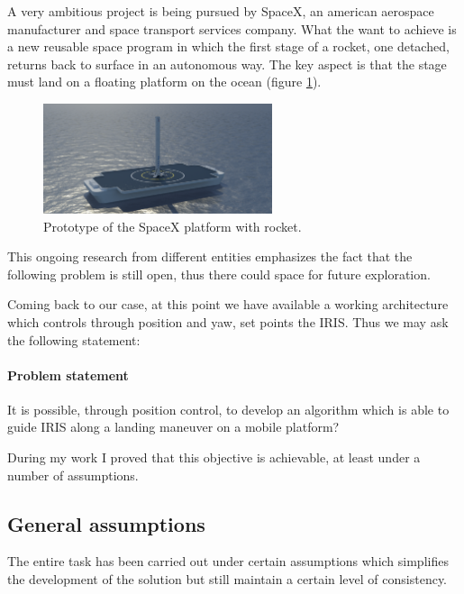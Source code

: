 A very ambitious project is being pursued by SpaceX, an american aerospace manufacturer and space transport services company. What the want to achieve is a new reusable space program in which the first stage of a rocket, one detached, returns back to surface in an autonomous way. The key aspect is that the stage must land on a floating platform on the ocean (figure \ref{figure:spacex}). 
\begin{figure}[h]
 \centering
   \includegraphics[width = 0.6\textwidth ]{spacex.png}
    \caption{Prototype of the SpaceX platform with rocket.}
   \label{figure:spacex}
\end{figure}

This ongoing research from different entities emphasizes the fact that the following problem is still open, thus there could space for future exploration. 

Coming back to our case, at this point we have available a working architecture which controls through position and yaw, set points the IRIS. Thus we may ask the following statement:	

\paragraph{Problem statement} It is possible, through position control, to develop an algorithm which is able to guide IRIS along a landing maneuver on a mobile platform? \newline

\noindent
During my work I proved that this objective is achievable, at least under a number of assumptions.

\subsection{General assumptions}

The entire task has been carried out under certain assumptions which simplifies the development of the solution but still maintain a certain level of consistency. 

